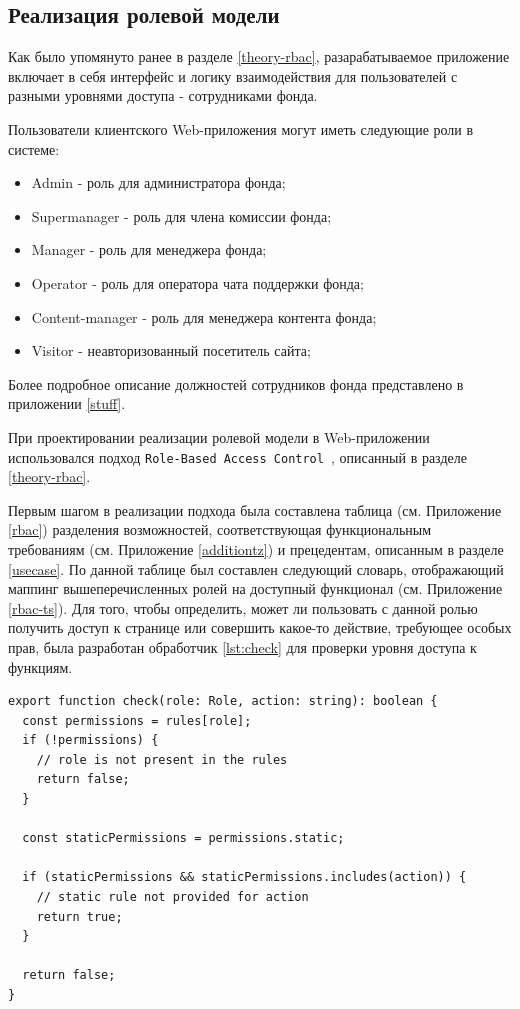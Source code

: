 \documentclass[a4paper,12pt,reqno]{article}
\begin{document}
\subsection{Реализация ролевой модели}

Как было упомянуто ранее в разделе \ref{theory-rbac}, разарабатываемое приложение включает в себя интерфейс и логику взаимодействия для пользователей с разными уровнями доступа - сотрудниками фонда.

Пользователи клиентского Web-приложения могут иметь следующие роли в системе: 

\begin{itemize}
    \item Admin - роль для администратора фонда;
    \item Supermanager - роль для члена комиссии фонда;
    \item Manager - роль для менеджера фонда;
    \item Operator - роль для оператора чата поддержки фонда;
    \item Content-manager - роль для менеджера контента фонда;
    \item Visitor - неавторизованный посетитель сайта;
\end{itemize}

Более подробное описание должностей сотрудников фонда представлено в приложении \ref{stuff}.

При проектировании реализации ролевой модели в Web-приложении использовался подход \texttt{Role-Based Access Control}~\cite{rbac}, описанный в разделе \ref{theory-rbac}. 

Первым шагом в реализации подхода была составлена таблица (см. Приложение \ref{rbac}) разделения возможностей, соответствующая функциональным требованиям (см. Приложение \ref{additiontz}) и прецедентам, описанным в разделе \ref{usecase}. По данной таблице был составлен следующий словарь, отображающий маппинг вышеперечисленных ролей на доступный функционал (см. Приложение \ref{rbac-ts}). Для того, чтобы определить, может ли пользовать с данной ролью получить доступ к странице или совершить какое-то действие, требующее особых прав, была разработан обработчик \ref{lst:check} для проверки уровня доступа к функциям.

\begin{lstlisting}[frame=single, basicstyle=\footnotesize\ttfamily, label={lst:check}, caption={Check функция для проверки уровня доступа},captionpos=b]
export function check(role: Role, action: string): boolean {
  const permissions = rules[role];
  if (!permissions) {
    // role is not present in the rules
    return false;
  }

  const staticPermissions = permissions.static;

  if (staticPermissions && staticPermissions.includes(action)) {
    // static rule not provided for action
    return true;
  }

  return false;
}

\end{lstlisting}
\end{document}
